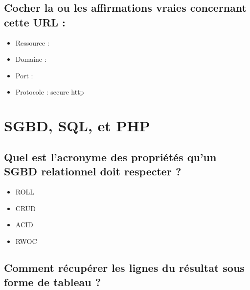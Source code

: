 \documentclass[11pt,a4paper]{article}
\begin{document}
\subsection{Cocher la ou les affirmations vraies concernant cette URL :}


\bigskip

\begin{itemize}
\item[\CaseCoche] Ressource :  \\  %
\item[\CaseCoche] Domaine :  \\
\item[\CaseCoche] Port :  \\  %
\item[\CaseCoche] Protocole : secure http\\  %
\end{itemize}


\section{SGBD, SQL, et PHP}

\subsection{Quel est l'acronyme des propriétés qu'un SGBD relationnel doit respecter ?}
\begin{itemize}
\item[\CaseCoche] ROLL \\
\item[\CaseCoche] CRUD \\
\item[\CaseCoche] ACID \\  %
\item[\CaseCoche] RWOC \\
\end{itemize}


\subsection{Comment récupérer les lignes du résultat sous forme de tableau ?}


\bigskip
\end{document}
